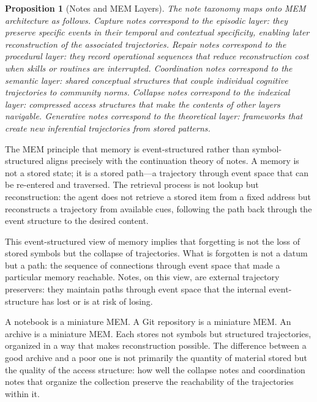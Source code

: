 \documentclass[12pt, a4paper]{article}
\theoremstyle{plain}
\newtheorem{proposition}[theorem]{Proposition}
\theoremstyle{definition}
\theoremstyle{remark}
\begin{document}
\begin{proposition}[Notes and MEM Layers]
The note taxonomy maps onto MEM architecture as follows. Capture notes
correspond to the episodic layer: they preserve specific events in their temporal
and contextual specificity, enabling later reconstruction of the associated
trajectories. Repair notes correspond to the procedural layer: they record
operational sequences that reduce reconstruction cost when skills or routines are
interrupted. Coordination notes correspond to the semantic layer: shared
conceptual structures that couple individual cognitive trajectories to community
norms. Collapse notes correspond to the indexical layer: compressed access
structures that make the contents of other layers navigable. Generative notes
correspond to the theoretical layer: frameworks that create new inferential
trajectories from stored patterns.
\end{proposition}

The MEM principle that memory is event-structured rather than symbol-
structured aligns precisely with the continuation theory of notes. A memory is not
a stored state; it is a stored path---a trajectory through event space that can be
re-entered and traversed. The retrieval process is not lookup but reconstruction:
the agent does not retrieve a stored item from a fixed address but reconstructs a
trajectory from available cues, following the path back through the event structure
to the desired content.

This event-structured view of memory implies that forgetting is not the loss of
stored symbols but the collapse of trajectories. What is forgotten is not a datum
but a path: the sequence of connections through event space that made a particular
memory reachable. Notes, on this view, are external trajectory preservers: they
maintain paths through event space that the internal event-structure has lost or
is at risk of losing.

A notebook is a miniature MEM. A Git repository is a miniature
MEM. An archive is a miniature MEM. Each stores not symbols but
structured trajectories, organized in a way that makes reconstruction possible.
The difference between a good archive and a poor one is not primarily the quantity
of material stored but the quality of the access structure: how well the collapse
notes and coordination notes that organize the collection preserve the
reachability of the trajectories within it.

\end{document}

